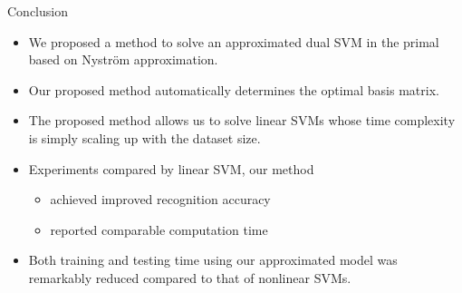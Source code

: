 \documentclass{beamer}
\begin{document}
\begin{frame}{Conclusion}
\begin{itemize}
  \item We proposed a method to solve an approximated dual SVM in the primal based on Nystr\"om approximation.
  \item Our proposed method automatically determines the optimal basis matrix.
  \item The proposed method allows us to solve linear SVMs whose time complexity is simply scaling up with the dataset size.
  \item Experiments compared by linear SVM, our method
  \begin{itemize}
    \item achieved improved recognition accuracy
    \item reported comparable computation time
  \end{itemize}
  \item Both training and testing time using our approximated model was remarkably reduced compared to that of nonlinear SVMs.
\end{itemize}
\end{frame}
\end{document}
